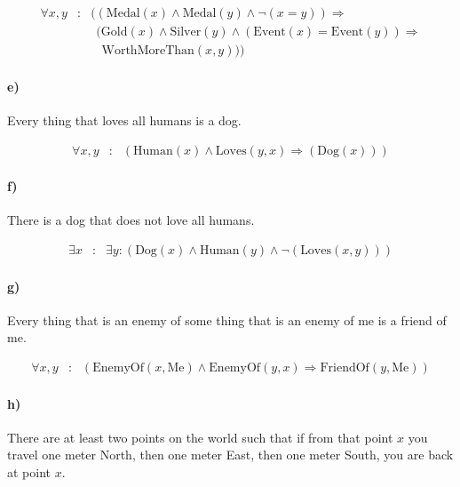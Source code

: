 \documentclass[12pt,letterpaper]{article}
\newcommand\myand{\wedge}
\newcommand\mynot{\neg}
\renewcommand\implies{\Rightarrow}
\begin{document}
\begin{eqnarray*}
\forall x, y &:& ((\text{Medal}(x) \myand \text{Medal}(y) \myand \mynot(x=y)) \implies \\
&& ~~(\text{Gold}(x) \myand \text{Silver}(y) \myand (\text{Event}(x) = \text{Event}(y)) \implies \\
&& ~~~~\text{WorthMoreThan}(x, y))
)
\end{eqnarray*}

\paragraph{e)} Every thing that loves all humans is a dog.

\begin{eqnarray*}
\forall x, y &:& (\text{Human}(x) \myand \text{Loves}(y, x) \implies (\text{Dog}(x)))
\end{eqnarray*}

\paragraph{f)} There is a dog that does not love all humans.

\begin{eqnarray*}
\exists x &:& \exists y : (\text{Dog}(x) \myand \text{Human}(y) \myand \mynot(\text{Loves}(x, y)))
\end{eqnarray*}

\paragraph{g)} Every thing that is an enemy of some thing that is an enemy of me is a friend of me.

\begin{eqnarray*}
\forall x, y &:& (\text{EnemyOf}(x, \text{Me}) \myand \text{EnemyOf}(y, x) \implies \text{FriendOf}(y, \text{Me}))
\end{eqnarray*}

\paragraph{h)} There are at least two points on the world such that if from that point $x$ you travel one meter North, then one meter East, then one meter South, you are back at point $x$.

\end{document}
